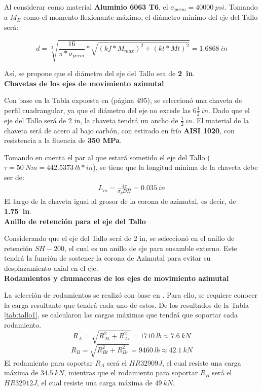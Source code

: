 Al considerar como material \textbf{Aluminio 6063 T6}, el $ \sigma_{perm} = 40000\ psi $. Tomando a $M_B$ como el momento flexionante máximo, el diámetro mínimo del eje del Tallo será:

\begin{equation}
d=\sqrt[3]{\frac{16}{\pi*\sigma_{perm}}*\sqrt{(kf*M_{max})^2+(kt*Mt)^2}}=1.6868\ in
\end{equation}

Así, se propone que el diámetro del eje del Tallo sea de \textbf{2\ in}.\\

\textbf{Chavetas de los ejes de movimiento azimutal}

Con base en la Tabla expuesta en \cite{DDA3} (página 495), se seleccionó una chaveta de perfil cuadrangular, ya que el diámetro del eje no excede las $ 6 \frac{1}{2}\ in $. Dado que el eje del Tallo será de 2 in, la chaveta tendrá un ancho de $ \frac{1}{2}\ in$. El material de la chaveta será de acero al bajo carbón, con estirado en frío \textbf{AISI 1020}, con resistencia a la fluencia de \textbf{350 MPa}.

Tomando en cuenta el par al que estará sometido el eje del Tallo ($ \tau =50\ Nm= 442.5373\ lb*in$), se tiene que la longitud mínima de la chaveta debe ser de:
\begin{eqnarray}
L_m=\frac{4\tau}{\sigma_{p}DH}=0.035\ in
\end{eqnarray}
El largo de la chaveta igual al grosor de la corona de azimutal, es decir, de \textbf{1.75\ in}.\\

\textbf{Anillo de retención para el eje del Tallo}

Considerando que el eje del Tallo será de 2 in, se seleccionó en \cite{DDA4} el anillo de retención $ SH-200 $, el cual es un anillo de eje para ensamble externo. Este tendrá la función de sostener la corona de Azimutal para evitar su desplazamiento axial en el eje.\\

\textbf{Rodamientos y chumaceras de los ejes de movimiento azimutal}

La selección de rodamientos se realizó con base en \cite{DDA5}. Para ello, se requiere conocer la carga resultante que tendrá cada uno de estos. De los resultados de la Tabla \ref{tab:tallo1}, se calcularon las cargas máximas que tendrá que soportar cada rodamiento.
\begin{equation}
R_A=\sqrt{R_{At}^2+R_{Ar}^2}=1710\ lb \approx 7.6\ kN
\end{equation}
\begin{equation}
R_B=\sqrt{R_{Bt}^2+R_{Br}^2}=9460\ lb \approx 42.1\ kN
\end{equation}
El rodamiento para soportar $ R_A $ será el $ HR 32909 J $, el cual resiste una carga máxima de $ 34.5\ kN $, mientras que el rodamiento para soportar $ R_B $ será el $ HR 32912 J $, el cual resiste una carga máxima de $ 49\ kN $.

